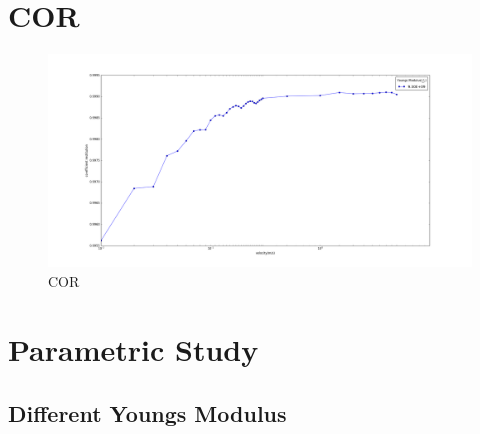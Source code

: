 \section{COR}

\begin{figure}[H]
\includegraphics[width=1.0\textwidth]{../images/COR/COR.png}
\caption{COR}
\label{fig:COR}
\end{figure}


\section{Parametric Study}

\subsection{Different Youngs Modulus}

\begin{figure}[H]
\end{figure}


